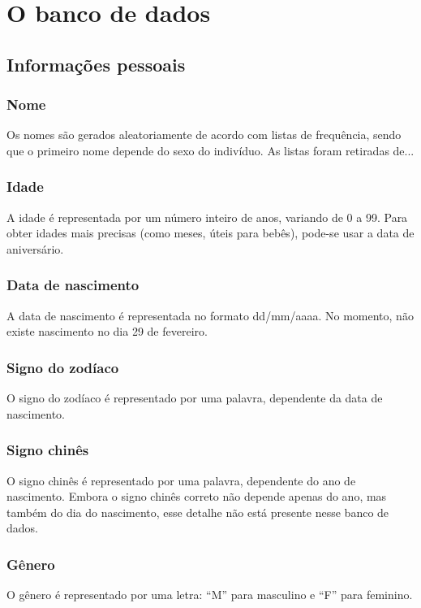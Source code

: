 \documentclass{book}
\begin{document}
\tableofcontents

\chapter{O banco de dados}
\section{Informações pessoais}
\subsection{Nome}
Os nomes são gerados aleatoriamente de acordo com listas de frequência, sendo que o primeiro nome depende do sexo do indivíduo. As listas foram retiradas de...

\subsection{Idade}
A idade é representada por um número inteiro de anos, variando de 0 a 99. Para obter idades mais precisas (como meses, úteis para bebês), pode-se usar a data de aniversário.

\subsection{Data de nascimento}
A data de nascimento é representada no formato dd/mm/aaaa. No momento, não existe nascimento no dia 29 de fevereiro.

\subsection{Signo do zodíaco}
O signo do zodíaco é representado por uma palavra, dependente da data de nascimento.

\subsection{Signo chinês}
O signo chinês é representado por uma palavra, dependente do ano de nascimento. Embora o signo chinês correto não depende apenas do ano, mas também do dia do nascimento, esse detalhe não está presente nesse banco de dados.

\subsection{Gênero}
O gênero é representado por uma letra: ``M'' para masculino e ``F'' para feminino.
\end{document}
